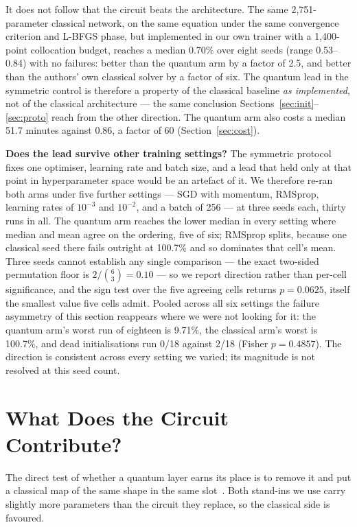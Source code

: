 \documentclass[conference,a4paper]{IEEEtran}
\begin{document}
It does not follow that the circuit beats the architecture. The same 2{,}751-parameter
classical network, on the same equation under the same convergence criterion and L-BFGS
phase, but implemented in our own trainer with a 1{,}400-point collocation budget, reaches
a median 0.70\% over eight seeds (range 0.53--0.84) with no failures: better than the
quantum arm by a factor of 2.5, and better than the authors' own classical solver by a
factor of six. The quantum lead in the symmetric control is therefore a property of the
classical baseline \emph{as implemented}, not of the classical architecture --- the same
conclusion Sections~\ref{sec:init}--\ref{sec:proto} reach from the other direction. The
quantum arm also costs a median 51.7 minutes against 0.86, a factor of 60
(Section~\ref{sec:cost}).

\textbf{Does the lead survive other training settings?} The symmetric protocol fixes one
optimiser, learning rate and batch size, and a lead that held only at that point in
hyperparameter space would be an artefact of it. We therefore re-ran both arms under five
further settings --- SGD with momentum, RMSprop, learning rates of $10^{-3}$ and
$10^{-2}$, and a batch of 256 --- at three seeds each, thirty runs in all. The quantum arm
reaches the lower median in every setting where median and mean agree on the ordering,
five of six; RMSprop splits, because one classical seed there fails outright at 100.7\%
and so dominates that cell's mean. Three seeds cannot establish any single comparison ---
the exact two-sided permutation floor is $2/\binom{6}{3} = 0.10$ --- so we report
direction rather than per-cell significance, and the sign test over the five agreeing
cells returns $p = 0.0625$, itself the smallest value five cells admit. Pooled across all
six settings the failure asymmetry of this section reappears where we were not looking for
it: the quantum arm's worst run of eighteen is 9.71\%, the classical arm's worst is
100.7\%, and dead initialisations run 0/18 against 2/18 (Fisher $p = 0.4857$). The
direction is consistent across every setting we varied; its magnitude is not resolved at
this seed count.

\section{What Does the Circuit Contribute?}
\label{sec:abl}

The direct test of whether a quantum layer earns its place is to remove it and put a
classical map of the same shape in the same slot~\cite{bowles}. Both stand-ins we use
carry slightly more parameters than the circuit they replace, so the classical side is
favoured.
\end{document}
